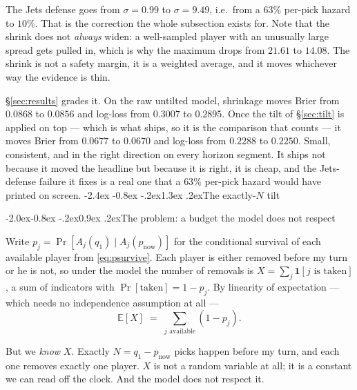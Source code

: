 \documentclass[10pt,a4paper]{article}
\makeatletter
\theoremstyle{plain}
\theoremstyle{definition}
\theoremstyle{remark}
\renewcommand\section{\@startsection{section}{1}{\z@}%
  {-2.4ex \@plus -0.8ex \@minus -.2ex}{1.3ex \@plus.2ex}{\normalfont\Large\bfseries}}
\renewcommand\subsection{\@startsection{subsection}{2}{\z@}%
  {-2.0ex\@plus -0.8ex \@minus -.2ex}{0.9ex \@plus .2ex}{\normalfont\large\bfseries}}
\makeatother
\begin{document}
The Jets defense goes from $\sigma = 0.99$ to $\sigma = 9.49$, i.e.\ from a $63\%$
per-pick hazard to $10\%$. That is the correction the whole subsection exists for. Note
that the shrink does not \emph{always} widen: a well-sampled player with an unusually
large spread gets pulled in, which is why the maximum drops from $21.61$ to $14.08$.
The shrink is not a safety margin, it is a weighted average, and it moves whichever way
the evidence is thin.

\S\ref{sec:results} grades it. On the raw untilted model, shrinkage moves Brier from
$0.0868$ to $0.0856$ and log-loss from $0.3007$ to $0.2895$. Once the tilt of
\S\ref{sec:tilt} is applied on top --- which is what ships, so it is the comparison that
counts --- it moves Brier from $0.0677$ to $0.0670$ and log-loss from $0.2288$ to
$0.2250$. Small, consistent, and in the right direction on every horizon segment. It
ships not because it moved the headline but because it is right, it is cheap, and the
Jets-defense failure it fixes is a real one that a $63\%$ per-pick hazard would have
printed on screen.
\section{The exactly-\texorpdfstring{$N$}{N} tilt}
\label{sec:tilt}

\subsection{The problem: a budget the model does not respect}
\label{sec:tiltproblem}

Write $p_j = \Pr[A_j(q_1) \mid A_j(p_{\text{now}})]$ for the conditional survival of
each available player from \eqref{eq:psurvive}. Each player is either removed before my
turn or he is not, so under the model the number of removals is
$X = \sum_j \mathbf{1}[\text{$j$ is taken}]$, a sum of indicators with
$\Pr[\text{taken}] = 1 - p_j$. By linearity of expectation --- which needs no
independence assumption at all ---
\begin{equation}
\mathbb{E}[X] \;=\; \sum_{j \text{ available}} (1 - p_j).
\label{eq:expectedremovals}
\end{equation}

But we \emph{know} $X$. Exactly $N = q_1 - p_{\text{now}}$ picks happen before my turn,
and each one removes exactly one player. $X$ is not a random variable at all; it is a
constant we can read off the clock. And the model does not respect it.
\end{document}
